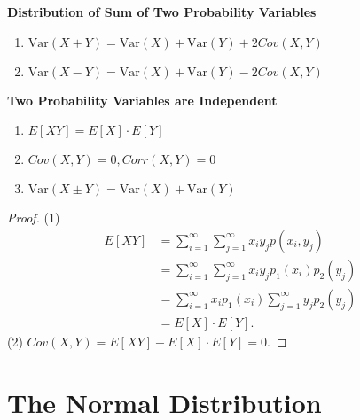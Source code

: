 \documentclass[12pt,openany]{book}
\theoremstyle{definition}
\newcommand{\Var}{\text{Var}}
\newcommand{\Cov}{\textit{Cov}}
\newcommand{\Corr}{\textit{Corr}}
\begin{document}
	\begin{tcolorbox}[colback=white]\begin{center}
			\textbf{Distribution of Sum of Two Probability Variables}
		\end{center} \begin{enumerate}
			\item \(\Var(X+Y)=\Var(X)+\Var(Y)+2\Cov(X,Y) \)
			\item \(\Var(X-Y)=\Var(X)+\Var(Y)-2\Cov(X,Y) \)
		\end{enumerate}	
	\end{tcolorbox}
	
	\begin{tcolorbox}[colback=white]\begin{center}
			\textbf{Two Probability Variables are Independent}
		\end{center}\begin{enumerate}
			\item \(E[XY]=E[X]\cdot E[Y] \)
			\item \(\Cov(X,Y)=0, \Corr(X,Y)=0 \)
			\item \(\Var(X\pm Y)=\Var(X)+\Var(Y) \)
		\end{enumerate}\begin{proof}
			(1) \begin{align*}
				E[XY] &= \sum_{i=1}^\infty\sum_{j=1}^\infty x_iy_jp(x_i,y_j) \\
				&= \sum_{i=1}^\infty\sum_{j=1}^\infty x_iy_jp_1(x_i)p_2(y_j) \\
				&= \sum_{i=1}^\infty x_ip_1(x_i)\sum_{j=1}^\infty y_jp_2(y_j)  \\
				&=E[X]\cdot E[Y].
			\end{align*} 
			(2) $\Cov(X,Y) = E[XY]-E[X]\cdot E[Y]=0$.
		\end{proof}
		
	\end{tcolorbox}
	
	\section{The Normal Distribution}
	
\end{document}
